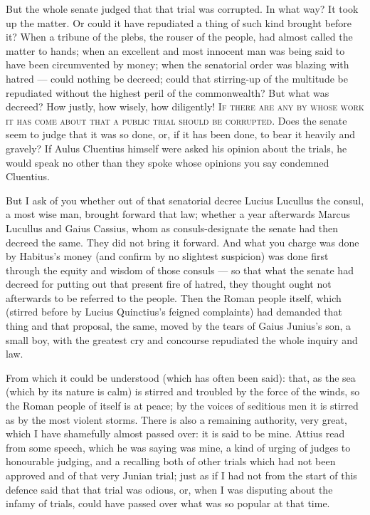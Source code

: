 But the whole senate judged that that trial was corrupted. In what way? It took up the matter. Or could it have repudiated a thing of such kind brought before it? When a tribune of the plebs, the rouser of the people, had almost called the matter to hands; when an excellent and most innocent man was being said to have been circumvented by money; when the senatorial order was blazing with hatred --- could nothing be decreed; could that stirring-up of the multitude be repudiated without the highest peril of the commonwealth? But what was decreed? How justly, how wisely, how diligently! \textsc{If there are any by whose work it has come about that a public trial should be corrupted}. Does the senate seem to judge that it was so done, or, if it has been done, to bear it heavily and gravely? If Aulus Cluentius himself were asked his opinion about the trials, he would speak no other than they spoke whose opinions you say condemned Cluentius.

 But I ask of you whether out of that senatorial decree Lucius Lucullus the consul, a most wise man, brought forward that law; whether a year afterwards Marcus Lucullus and Gaius Cassius, whom as consuls-designate the senate had then decreed the same. They did not bring it forward. And what you charge was done by Habitus's money (and confirm by no slightest suspicion) was done first through the equity and wisdom of those consuls --- so that what the senate had decreed for putting out that present fire of hatred, they thought ought not afterwards to be referred to the people. Then the Roman people itself, which (stirred before by Lucius Quinctius's feigned complaints) had demanded that thing and that proposal, the same, moved by the tears of Gaius Junius's son, a small boy, with the greatest cry and concourse repudiated the whole inquiry and law.

 From which it could be understood (which has often been said): that, as the sea (which by its nature is calm) is stirred and troubled by the force of the winds, so the Roman people of itself is at peace; by the voices of seditious men it is stirred as by the most violent storms. There is also a remaining authority, very great, which I have shamefully almost passed over: it is said to be mine. Attius read from some speech, which he was saying was mine, a kind of urging of judges to honourable judging, and a recalling both of other trials which had not been approved and of that very Junian trial; just as if I had not from the start of this defence said that that trial was odious, or, when I was disputing about the infamy of trials, could have passed over what was so popular at that time.

